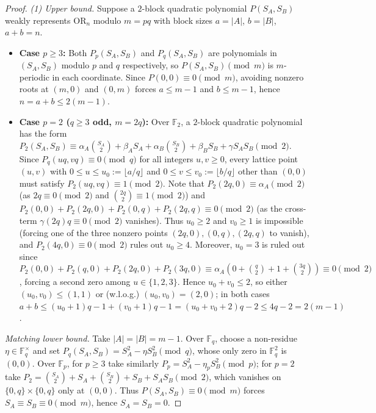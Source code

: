 \documentclass[11pt,a4paper]{article}
\theoremstyle{definition}
\newcommand{\F}{\mathbb{F}}
\newcommand{\OR}{\mathrm{OR}}
\begin{document}
\begin{proof}
\emph{(1) Upper bound.} Suppose a $2$-block quadratic polynomial $P(S_A, S_B)$ weakly represents $\OR_n$ modulo $m = pq$ with block sizes $a = |A|$, $b = |B|$, $a + b = n$.
\begin{itemize}[nosep]
  \item \textbf{Case $p \ge 3$:} Both $P_p(S_A, S_B)$ and $P_q(S_A, S_B)$ are polynomials in $(S_A, S_B)$ modulo $p$ and $q$ respectively, so $P(S_A, S_B) \pmod m$ is $m$-periodic in each coordinate. Since $P(0, 0) \equiv 0 \pmod m$, avoiding nonzero roots at $(m, 0)$ and $(0, m)$ forces $a \le m - 1$ and $b \le m - 1$, hence $n = a + b \le 2(m - 1)$.
  \item \textbf{Case $p = 2$ ($q \ge 3$ odd, $m = 2q$):} Over $\F_2$, a $2$-block quadratic polynomial has the form $P_2(S_A, S_B) \equiv \alpha_A \binom{S_A}{2} + \beta_A S_A + \alpha_B \binom{S_B}{2} + \beta_B S_B + \gamma S_A S_B \pmod 2$. Since $P_q(uq, vq) \equiv 0 \pmod q$ for all integers $u, v \ge 0$, every lattice point $(u, v)$ with $0 \le u \le u_0 := \lfloor a/q \rfloor$ and $0 \le v \le v_0 := \lfloor b/q \rfloor$ other than $(0, 0)$ must satisfy $P_2(uq, vq) \equiv 1 \pmod 2$. Note that $P_2(2q, 0) \equiv \alpha_A \pmod 2$ (as $2q \equiv 0 \pmod 2$ and $\binom{2q}{2} \equiv 1 \pmod 2$) and $P_2(0, 0) + P_2(2q, 0) + P_2(0, q) + P_2(2q, q) \equiv 0 \pmod 2$ (as the cross-term $\gamma (2q) q \equiv 0 \pmod 2$ vanishes). Thus $u_0 \ge 2$ and $v_0 \ge 1$ is impossible (forcing one of the three nonzero points $(2q,0),(0,q),(2q,q)$ to vanish), and $P_2(4q, 0) \equiv 0 \pmod 2$ rules out $u_0 \ge 4$. Moreover, $u_0 = 3$ is ruled out since $P_2(0,0) + P_2(q,0) + P_2(2q,0) + P_2(3q,0) \equiv \alpha_A (0 + \binom{q}{2} + 1 + \binom{3q}{2}) \equiv 0 \pmod 2$, forcing a second zero among $u \in \{1, 2, 3\}$. Hence $u_0 + v_0 \le 2$, so either $(u_0, v_0) \le (1, 1)$ or (w.l.o.g.) $(u_0, v_0) = (2, 0)$; in both cases $a + b \le (u_0 + 1)q - 1 + (v_0 + 1)q - 1 = (u_0 + v_0 + 2)q - 2 \le 4q - 2 = 2(m - 1)$.
\end{itemize}
\emph{Matching lower bound.} Take $|A| = |B| = m - 1$. Over $\F_q$, choose a non-residue $\eta \in \F_q^\times$ and set $P_q(S_A, S_B) = S_A^2 - \eta S_B^2 \pmod q$, whose only zero in $\F_q^2$ is $(0, 0)$. Over $\F_p$, for $p \ge 3$ take similarly $P_p = S_A^2 - \eta_p S_B^2 \pmod p$; for $p = 2$ take $P_2 = \binom{S_A}{2} + S_A + \binom{S_B}{2} + S_B + S_A S_B \pmod 2$, which vanishes on $\{0, q\} \times \{0, q\}$ only at $(0, 0)$. Thus $P(S_A, S_B) \equiv 0 \pmod m$ forces $S_A \equiv S_B \equiv 0 \pmod m$, hence $S_A = S_B = 0$.


\end{proof}
\end{document}
